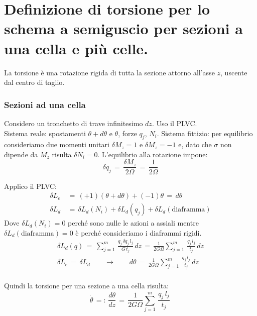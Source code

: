 \section{Definizione di torsione per lo schema a semiguscio per sezioni a una cella e più celle.}

La torsione è una rotazione rigida di tutta la sezione attorno all'asse $z$, uscente dal centro di taglio.

\subsubsection*{ Sezioni ad una cella}
Considero un tronchetto di trave infinitesimo $dz$. Uso il PLVC.\\
Sistema reale: spostamenti $\theta + d\theta$ e $\theta$, forze $q_j$, $N_i$. Sistema fittizio: per equilibrio consideriamo due momenti unitari $\delta M_z =1$ e $\delta M_z =-1$ e, dato che $\sigma$ non dipende da $M_z$ risulta  $\delta N_i=0$. L'equilibrio alla rotazione impone:
\begin{equation*}
    \delta q_j \,=\, \frac{\delta M_z}{2\Omega}\,=\,\frac{1}{2\Omega}
\end{equation*}

Applico il PLVC:
\begin{align*}
    \delta L_e\,&=\, (+1)(\theta + d\theta) + (-1)\theta \,=\,  d\theta\\
     \delta L_d\,&=\, \delta L_d(N_i) + \delta L_d(q_j) + \delta L_d(\mathrm{diaframma} ) 
\end{align*}
Dove $\delta L_d(N_i)=0$ perché sono nulle le azioni a assiali mentre $\delta L_d(\mathrm{diaframma})=0$ è perché consideriamo i diaframmi rigidi.\\

\begin{align*}
    \delta L_d(q)\,=\, \sum^m_{j=1}\,\frac{q_j\,\delta q_j\,l_j}{G\,t_j}\,dz
    \,=\, \frac{1}{2G\Omega}\sum^m_{j=1}\,\frac{q_j\,l_j}{t_j}\,dz\\
    \delta L_e \,=\, \delta L_d  
    \quad\quad\rightarrow\quad\quad
    d\theta \,=\,\frac{1}{2G\Omega}\sum^m_{j=1}\,\frac{q_j\,l_j}{t_j}\,dz\\
\end{align*}

Quindi la torsione per una sezione a una cella risulta:
\begin{equation*}
    \dot{\theta} \,=:\, \frac{d\theta}{dz}\,=\,\frac{1}{2G\Omega}\sum^m_{j=1}\,\frac{q_j\,l_j}{t_j}\,
\end{equation*}



